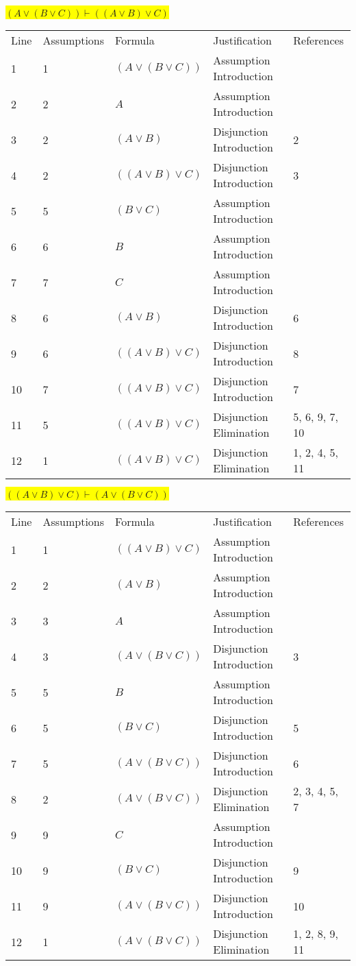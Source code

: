 \documentclass[12pt]{article}
\newcommand{\pr}[1]{\bigbreak \colorbox{Yellow}{$#1$} \smallbreak}
\begin{document}
\begin{flushleft}
\pr{(A\lor (B\lor C)) \vdash ((A\lor B)\lor C)}
\begin{tabular}{lllll}
    Line & Assumptions & Formula & Justification & References \\
    1 & 1 & $(A\lor (B\lor C))$  & Assumption Introduction &  \\
    2 & 2 & $A$  & Assumption Introduction &  \\
    3 & 2 & $(A\lor B)$  & Disjunction Introduction & 2 \\
    4 & 2 & $((A\lor B)\lor C)$  & Disjunction Introduction & 3 \\
    5 & 5 & $(B\lor C)$  & Assumption Introduction &  \\
    6 & 6 & $B$  & Assumption Introduction &  \\
    7 & 7 & $C$  & Assumption Introduction &  \\
    8 & 6 & $(A\lor B)$  & Disjunction Introduction & 6 \\
    9 & 6 & $((A\lor B)\lor C)$  & Disjunction Introduction & 8 \\
    10 & 7 & $((A\lor B)\lor C)$  & Disjunction Introduction & 7 \\
    11 & 5 & $((A\lor B)\lor C)$  & Disjunction Elimination & 5, 6, 9, 7, 10 \\
    12 & 1 & $((A\lor B)\lor C)$  & Disjunction Elimination & 1, 2, 4, 5, 11 \\
\end{tabular}

\pr{((A\lor B)\lor C) \vdash (A\lor (B\lor C))}
\begin{tabular}{lllll}
    Line & Assumptions & Formula & Justification & References \\
    1 & 1 & $((A\lor B)\lor C)$  & Assumption Introduction &  \\
    2 & 2 & $(A\lor B)$  & Assumption Introduction &  \\
    3 & 3 & $A$  & Assumption Introduction &  \\
    4 & 3 & $(A\lor (B\lor C))$  & Disjunction Introduction & 3 \\
    5 & 5 & $B$  & Assumption Introduction &  \\
    6 & 5 & $(B\lor C)$  & Disjunction Introduction & 5 \\
    7 & 5 & $(A\lor (B\lor C))$  & Disjunction Introduction & 6 \\
    8 & 2 & $(A\lor (B\lor C))$  & Disjunction Elimination & 2, 3, 4, 5, 7 \\
    9 & 9 & $C$  & Assumption Introduction &  \\
    10 & 9 & $(B\lor C)$  & Disjunction Introduction & 9 \\
    11 & 9 & $(A\lor (B\lor C))$  & Disjunction Introduction & 10 \\
    12 & 1 & $(A\lor (B\lor C))$  & Disjunction Elimination & 1, 2, 8, 9, 11 \\
\end{tabular}


\end{flushleft}
\end{document}
